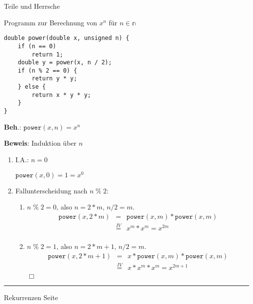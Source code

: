 \documentclass{slides}
\newcounter{mypage}
\begin{document}
\begin{slide}{}
\normalsize

\begin{center}
Teile und Herrsche
\end{center}
\vspace*{0.5cm}

\footnotesize
Programm zur Berechnung von $x^n$ f\"ur $n \in \mathbb{n}$
\begin{verbatim}
double power(double x, unsigned n) {
    if (n == 0)
        return 1;
    double y = power(x, n / 2);
    if (n % 2 == 0) {
        return y * y;
    } else {
        return x * y * y;
    }
}
\end{verbatim}
\textbf{Beh}.: \quad $\texttt{power}(x, n) = x^n$

\textbf{Beweis}: Induktion \"uber $n$
\begin{enumerate}
\item I.A.: $n = 0$ 

      $\mathtt{power}(x, 0) = 1 = x^0$
\item Fallunterscheidung nach $n \;\%\; 2$:
  \begin{enumerate}
  \item $n \;\%\; 2 = 0$, also $n = 2 * m$, $n/2 = m$.
        $$
        \begin{array}{lcl}
        \mathtt{power}(x,2*m) & =                & \mathtt{power}(x,m) * \mathtt{power}(x,m) \\
                              & \stackrel{IV}{=} & x^m * x^m = x^{2m} \\
        \end{array}
        $$
  \item $n \;\%\; 2 = 1$, also $n = 2 * m + 1$, $n/2 = m$.
        $$
        \begin{array}{lcl}
        \mathtt{power}(x,2*m+1) & =                & x * \mathtt{power}(x,m) * \mathtt{power}(x,m) \\
                                & \stackrel{IV}{=} & x* x^m * x^m = x^{2m+1} \\
        \end{array}
        $$\hspace*{\fill} $\Box$
  \end{enumerate}
\end{enumerate}


\vspace*{\fill}
\tiny \addtocounter{mypage}{1}
\rule{17cm}{1mm}
Rekurrenzen  \hspace*{\fill} Seite 
\end{slide}
\end{document}
